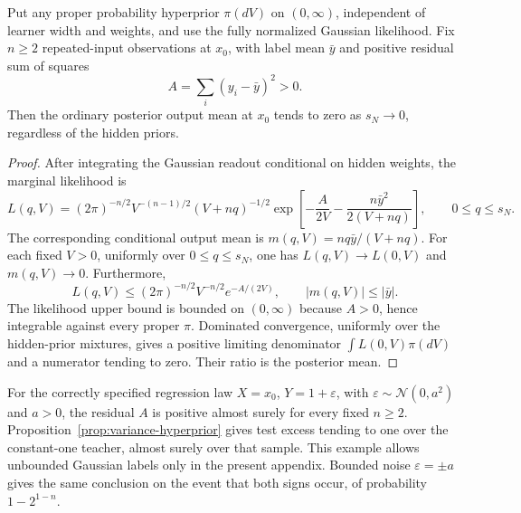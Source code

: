 \begin{proposition}
\label{prop:variance-hyperprior}
Put any proper probability hyperprior $\pi(dV)$ on $(0,\infty)$, independent of learner width and weights, and use the fully normalized Gaussian likelihood. Fix $n\ge2$ repeated-input observations at $x_0$, with label mean $\bar y$ and positive residual sum of squares
\[
 A=\sum_i(y_i-\bar y)^2>0.
\]
Then the ordinary posterior output mean at $x_0$ tends to zero as $s_N\to0$, regardless of the hidden priors.
\end{proposition}
\begin{proof}
After integrating the Gaussian readout conditional on hidden weights, the marginal likelihood is
\[
 L(q,V)=(2\pi)^{-n/2}V^{-(n-1)/2}(V+nq)^{-1/2}
 \exp\left[-\frac A{2V}-\frac{n\bar y^2}{2(V+nq)}\right],
 \qquad0\le q\le s_N.
\]
The corresponding conditional output mean is $m(q,V)=nq\bar y/(V+nq)$. For each fixed $V>0$, uniformly over $0\le q\le s_N$, one has $L(q,V)\to L(0,V)$ and $m(q,V)\to0$. Furthermore,
\[
 L(q,V)\le(2\pi)^{-n/2}V^{-n/2}e^{-A/(2V)},
 \qquad |m(q,V)|\le|\bar y|.
\]
The likelihood upper bound is bounded on $(0,\infty)$ because $A>0$, hence integrable against every proper $\pi$. Dominated convergence, uniformly over the hidden-prior mixtures, gives a positive limiting denominator $\int L(0,V)\pi(dV)$ and a numerator tending to zero. Their ratio is the posterior mean.
\end{proof}

For the correctly specified regression law $X=x_0$, $Y=1+\varepsilon$, with $\varepsilon\sim\mathcal N(0,a^2)$ and $a>0$, the residual $A$ is positive almost surely for every fixed $n\ge2$. Proposition~\ref{prop:variance-hyperprior} gives test excess tending to one over the constant-one teacher, almost surely over that sample. This example allows unbounded Gaussian labels only in the present appendix. Bounded noise $\varepsilon=\pm a$ gives the same conclusion on the event that both signs occur, of probability $1-2^{1-n}$.

